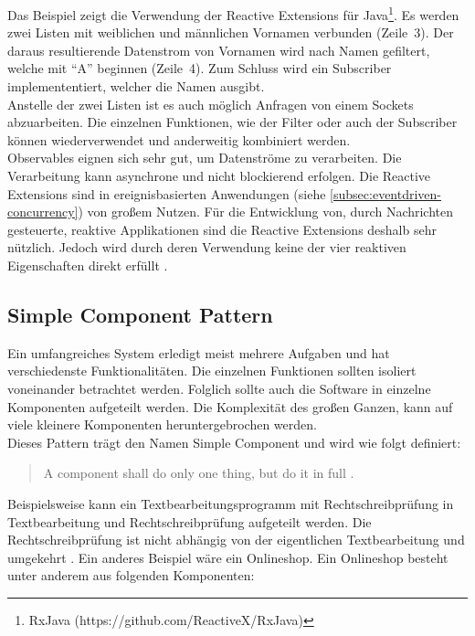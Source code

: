 Das Beispiel zeigt die Verwendung der Reactive Extensions für Java\footnote{RxJava (https://github.com/ReactiveX/RxJava)}. Es werden zwei Listen mit weiblichen und männlichen Vornamen verbunden (Zeile~3). Der daraus resultierende Datenstrom von Vornamen wird nach Namen gefiltert, welche mit \enquote{A} beginnen (Zeile~4). Zum Schluss wird ein Subscriber implemententiert, welcher die Namen ausgibt.\\
Anstelle der zwei Listen ist es auch möglich Anfragen von einem Sockets abzuarbeiten. Die einzelnen Funktionen, wie der Filter oder auch der Subscriber können wiederverwendet und anderweitig kombiniert werden.\\

Observables eignen sich sehr gut, um Datenströme zu verarbeiten. Die Verarbeitung kann asynchrone und nicht blockierend erfolgen. Die Reactive Extensions sind in ereignisbasierten Anwendungen (siehe \ref{subsec:eventdriven-concurrency}) von großem Nutzen. Für die Entwicklung von, durch Nachrichten gesteuerte, reaktive Applikationen sind die Reactive Extensions deshalb sehr nützlich. Jedoch wird durch deren Verwendung keine der vier reaktiven Eigenschaften direkt erfüllt \cite[S.~82]{kuhn_reactive_2015}.

\pagebreak

\subsection{Simple Component Pattern}\label{subsec:simple-component-pattern}
Ein umfangreiches System erledigt meist mehrere Aufgaben und hat verschiedenste Funktionalitäten. Die einzelnen Funktionen sollten isoliert voneinander betrachtet werden. Folglich sollte auch die Software in einzelne Komponenten aufgeteilt werden. Die Komplexität des großen Ganzen, kann auf viele kleinere Komponenten heruntergebrochen werden.\\
Dieses Pattern trägt den Namen Simple Component und wird wie folgt definiert:

\begin{quotation}
A component shall do only one thing, but do it in full \cite[S.~185]{kuhn_reactive_2015}.
\end{quotation}

Beispielsweise kann ein Textbearbeitungsprogramm mit Rechtschreibprüfung in Textbearbeitung und Rechtschreibprüfung aufgeteilt werden. Die Rechtschreibprüfung ist nicht abhängig von der eigentlichen Textbearbeitung und umgekehrt \cite[S.~185]{kuhn_reactive_2015}. Ein anderes Beispiel wäre ein Onlineshop. Ein Onlineshop besteht unter anderem aus folgenden Komponenten:


